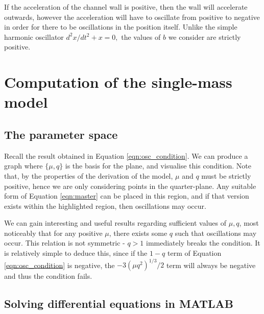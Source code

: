 \documentclass{article}
\begin{document}
If the acceleration of the channel wall is positive, then the wall will accelerate outwards,
however the acceleration will have to oscillate from positive to negative in order for there to be oscillations in the position itself.
Unlike the simple harmonic oscillator $d^2 x/dt^2 + x = 0,$ the values of $b$ we consider are strictly positive.

\section{Computation of the single-mass model}



\subsection{The parameter space}


Recall the result obtained in Equation \ref{eqn:osc_condition}.
We can produce a graph where $\{\mu, q\}$ is the basis for the plane,
and visualise this condition.
Note that, by the properties of the derivation of the model,
$\mu$ and $q$ must be strictly positive,
hence we are only considering points in the quarter-plane.
Any suitable form of Equation \ref{eqn:master} can be placed in this region,
and if that version exists within the highlighted region,
then oscillations may occur.

We can gain interesting and useful results regarding sufficient values of $\mu, q$,
most noticeably that for any positive $\mu$, there exists some $q$ such that oscillations may occur.
This relation is not symmetric - $q>1$ immediately breaks the condition.
It is relatively simple to deduce this, since if the $1-q$ term of Equation \ref{eqn:osc_condition} is negative,
the $-3(\mu q^2)^{1/3}/2$ term will always be negative and thus the condition fails.

\subsection{Solving differential equations in MATLAB}
\end{document}
